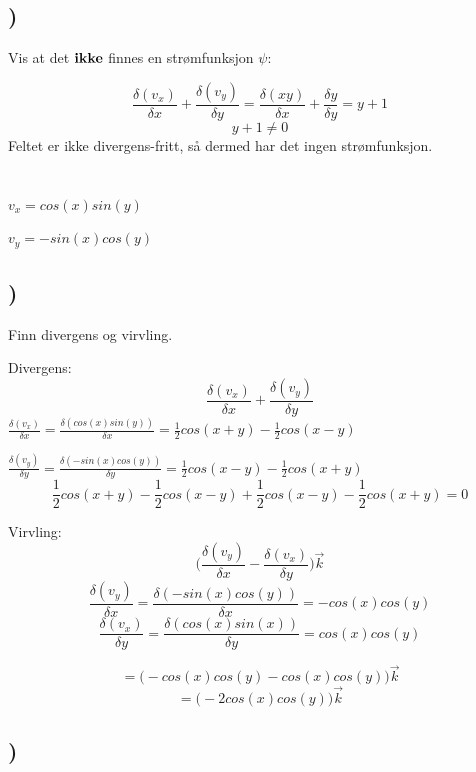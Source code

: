 \documentclass[a4paper,10pt,norsk]{article}
\begin{document}
\subsection{)}
Vis at det $\bold{ikke}$ finnes en strømfunksjon $\psi$:

\[\frac{\delta(v_{x})}{\delta x} + \frac{\delta(v_{y})}{\delta y} = \frac{\delta(xy)}{\delta x} + \frac{\delta y}{\delta y} = y + 1\]
\[y + 1 \neq 0\]
Feltet er ikke divergens-fritt, så dermed har det ingen strømfunksjon.

\section{}

$v_{x} = cos(x) sin(y)$

$v_{y} = -sin(x) cos(y)$

\subsection{)}
Finn divergens og virvling.

Divergens:
\[\frac{\delta(v_{x})}{\delta x} + \frac{\delta(v_{y})}{\delta y}\]
$\frac{\delta(v_{x})}{\delta x} = \frac{\delta(cos(x)sin(y))}{\delta x} = \frac{1}{2}cos(x + y) - \frac{1}{2}cos(x - y)$

$\frac{\delta(v_{y})}{\delta y} = \frac{\delta(-sin(x)cos(y))}{\delta y} = \frac{1}{2}cos(x - y) - \frac{1}{2}cos(x +y)$
\[\frac{1}{2}cos(x + y) - \frac{1}{2}cos(x - y) + \frac{1}{2}cos(x - y) - \frac{1}{2}cos(x +y) = 0\]

Virvling:
\[\Big(\frac{\delta(v_{y})}{\delta x} - \frac{\delta(v_{x})}{\delta y}\Big) \vec{k}\]
\[\frac{\delta(v_{y})}{\delta x} = \frac{\delta(-sin(x)cos(y))}{\delta x} = -cos(x)cos(y)\]
\[\frac{\delta(v_{x})}{\delta y} = \frac{\delta(cos(x)sin(x))}{\delta y} = cos(x)cos(y)\]

\[= \Big(-cos(x) cos(y) - cos(x)cos(y)\Big)\vec{k}\]
\[= \Big(-2cos(x)cos(y) \Big) \vec{k}\]


\subsection{)}
\end{document}

